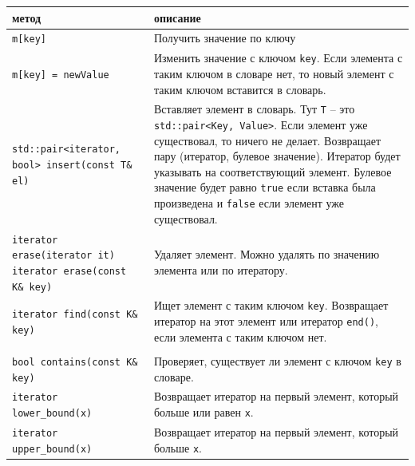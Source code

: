 \documentclass{article}
\begin{document}
\bgroup
\def\arraystretch{1.6}%
\begin{tabular}{ p{5.2cm} | p{11.8cm} }
метод & описание 
\\ \hline

\texttt{m[key]} & Получить значение по ключу
\\ \hline


\texttt{m[key] = newValue} 
& Изменить значение с ключом \texttt{key}. 
Если элемента с таким ключом в словаре нет, то новый элемент с таким ключом вставится в словарь.
\\ \hline


\texttt{std::pair<iterator, bool> \newline insert(const T\& el)}
& Вставляет элемент в словарь. Тут \texttt{T} -- это \texttt{std::pair<Key, Value>}. \newline
Если элемент уже существовал, то ничего не делает. \newline
Возвращает пару (итератор, булевое значение). Итератор будет указывать на соответствующий элемент.
Булевое значение будет равно \texttt{true} если вставка была произведена и \texttt{false} если
элемент уже существовал.
\\ \hline

\texttt{iterator erase(iterator it)}\newline     
\texttt{iterator erase(const K\& key)}
& Удаляет элемент. Можно удалять по значению элемента или по итератору.
\\ \hline

\texttt{iterator find(const K\& key)}
& Ищет элемент с таким ключом \texttt{key}. Возвращает итератор на этот элемент или итератор \texttt{end()}, если элемента с таким ключом нет.\\ 
\\ \hline

\texttt{bool contains(const K\& key)}
& Проверяет, существует ли элемент с ключом \texttt{key} в словаре.
\\ \hline

\texttt{iterator lower\_bound(x)}  
& Возвращает итератор на первый элемент, который больше или равен \texttt{x}.
\\ \hline
\texttt{iterator upper\_bound(x)}  
& Возвращает итератор на первый элемент, который больше \texttt{x}. \newline
\\
\end{tabular}
\egroup
\end{document}
